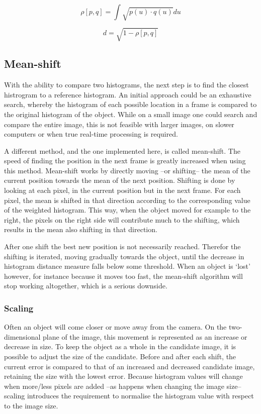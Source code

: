 \documentclass[a4paper,11pt]{article}
\begin{document}
\begin{equation}
\label{eq:bhattcoefficient}
\rho [p,q] = \int \sqrt{p(u)\cdot q(u)}du
\end{equation}

\begin{equation}
\label{eq:bhattdistance}
d = \sqrt{1-\rho [p,q]}
\end{equation}

\subsection{Mean-shift}
With the ability to compare two histograms, the next step is to find the closest histrogram to a reference histogram.
An initial approach could be an exhaustive search, whereby the histogram of each possible location in a frame is compared to the original histogram of the object.
While on a small image one could search and compare the entire image, this is not feasible with larger images, on slower computers or when true real-time processing is required.

A different method, and the one implemented here, is called mean-shift.
The speed of finding the position in the next frame is greatly increased when using this method.
Mean-shift works by directly moving --or shifting-- the mean of the current position towards the mean of the next position.
Shifting is done by looking at each pixel, in the current position but in the next frame.
For each pixel, the mean is shifted in that direction according to the corresponding value of the weighted histogram.
This way, when the object moved for example to the right, the pixels on the right side will contribute much to the shifting, which results in the mean also shifting in that direction.

After one shift the best new position is not necessarily reached.
Therefor the shifting is iterated, moving gradually towards the object, until the decrease in histogram distance measure falls below some threshold.
When an object is `lost' however, for instance because it moves too fast, the mean-shift algorithm will stop working altogether, which is a serious downside.

\subsubsection{Scaling}
Often an object will come closer or move away from the camera.
On the two-dimensional plane of the image, this movement is represented as an increase or decrease in size.
To keep the object as a whole in the candidate image, it is possible to adjust the size of the candidate.
Before and after each shift, the current error is compared to that of an increased and decreased candidate image, retaining the size with the lowest error.
Because histogram values will change when more/less pixels are added --as happens when changing the image size-- scaling introduces the requirement to normalise the histogram value with respect to the image size.
\end{document}
